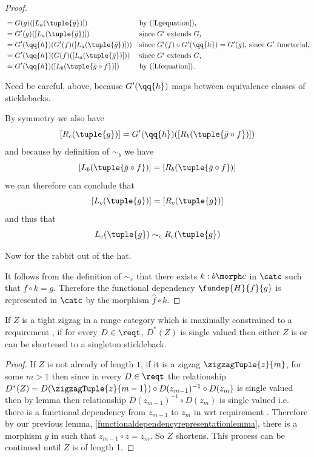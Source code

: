 \begin{proof}
\begin{align*}
[L_c(g)] 
        &= G(g)([L_a(\tuple{\bar{g}})])       
                && \mbox{by (\ref{Lgequation}),}\\
        &= G'(g)([L_a(\tuple{\bar{g}})])      
                && \mbox{since $G'$ extends $G$,} \\
        &= G'(\qq{h}) (G'(f)([L_a(\tuple{\bar{g}})])) 
                && \mbox{since $G'(f) \circ G'(\qq{h}) = G'(g)$, since $G'$ functorial,}\\
        &= G'(\qq{h}) (G(f)([L_a(\tuple{\bar{g}})])) 
                && \mbox{since $G'$ extends $G$,}  \\
	      &= G'(\qq{h}) ([L_b(\tuple{\bar{g} \circ f})])       
                &&\mbox{by (\ref{Lfequation}).} 
\end{align*}
\begin{commentary} 
Need be careful, above, because $G'(\qq{h})$ 
maps between equivalence classes of sticklebacks.
\end{commentary}
By symmetry we also have
$$[R_c(\tuple{g})] = G'(\qq{h}) ([R_b(\tuple{\bar{g} \circ f})])  $$
and because by definition of $\sim_b$ we have
$$[L_b(\tuple{\bar{g} \circ f})]=[R_b(\tuple{\bar{g} \circ f})]$$
we can therefore can conclude that
$$[L_c(\tuple{g})] = [R_c(\tuple{g})]$$
and thus that
$$ L_c(\tuple{g}) \sim_c R_c(\tuple{g})$$

\begin{aside}
Now for the rabbit out of the hat.
\end{aside}

It follows from the definition of $\sim_c$ that there exists $k:b \morph c$ in 
$\catc$ such that 
$f \circ k = g$.  
Therefore the functional dependency $\fundep{H}{f}{g}$ 
is represented in $\catc$ 
by the morphism $\widehat{f} \circ k$.
\end{proof}

\begin{lemma}
If $Z$ is a tight zigzag in a range category \catcw which is maximally constrained to a requirement \reqt, if for every $D \in \reqt$, $D^*(Z)$ is single valued
then either $Z$ is or can be shortened to a singleton stickleback.
\end{lemma}
\begin{proof}
If $Z$ is not already of length $1$, if it is a  
zigzag  $\zigzagTuple{z}{m}$, for some 
$m > 1$ then
since in every $D \in \reqt$ the relationship 
$D^*(Z)=D(\zigzagTuple{z}{m-1}) 
    \circ D(z_{m-1})^{-1} \circ D(z_m)$
is single valued then by lemma  then
relationship $D(z_{m-1})^{-1} \circ D(z_m)$ is
single valued i.e. there is a functional dependency 
from $z_{m-1}$ to $z_m$ in \catcw wrt requirement
\reqt. Therefore by our previous 
lemma, \ref{functionaldependencyrepresentationlemma}, there is a morphism $g$ in \catcw such that
$z_{m-1} \circ z = z_m$. So $Z$ shortens. This process can be continued until $Z$ is of length 1. 
\end{proof}

